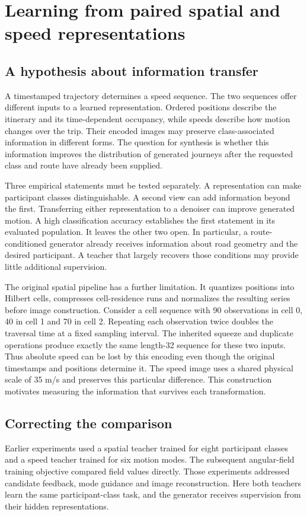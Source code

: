 \chapter{Learning from paired spatial and speed representations}
\label{ch:paired}
\section{A hypothesis about information transfer}
A timestamped trajectory determines a speed sequence. The two sequences offer different inputs to a learned representation. Ordered positions describe the itinerary and its time-dependent occupancy, while speeds describe how motion changes over the trip. Their encoded images may preserve class-associated information in different forms. The question for synthesis is whether this information improves the distribution of generated journeys after the requested class and route have already been supplied.

Three empirical statements must be tested separately. A representation can make participant classes distinguishable. A second view can add information beyond the first. Transferring either representation to a denoiser can improve generated motion. A high classification accuracy establishes the first statement in its evaluated population. It leaves the other two open. In particular, a route-conditioned generator already receives information about road geometry and the desired participant. A teacher that largely recovers those conditions may provide little additional supervision.

The original spatial pipeline has a further limitation. It quantizes positions into Hilbert cells, compresses cell-residence runs and normalizes the resulting series before image construction. Consider a cell sequence with 90 observations in cell 0, 40 in cell 1 and 70 in cell 2. Repeating each observation twice doubles the traversal time at a fixed sampling interval. The inherited squeeze and duplicate operations produce exactly the same length-32 sequence for these two inputs. Thus absolute speed can be lost by this encoding even though the original timestamps and positions determine it. The speed image uses a shared physical scale of 35 m/s and preserves this particular difference. This construction motivates measuring the information that survives each transformation.

\section{Correcting the comparison}
Earlier experiments used a spatial teacher trained for eight participant classes and a speed teacher trained for six motion modes. The subsequent angular-field training objective compared field values directly. Those experiments addressed candidate feedback, mode guidance and image reconstruction. Here both teachers learn the same participant-class task, and the generator receives supervision from their hidden representations.

